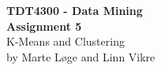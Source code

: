 
\begin{titlepage}
	\begin{center}

	
		{\Huge \bf TDT4300 - Data Mining} \\[2.0cm]
		{\Huge \bf Assignment 5} \\[6.0cm]


		{\Huge K-Means and Clustering} \\[8.0cm]


		{\Large by Marte Løge and Linn Vikre} \\[1.0cm]


	\end{center}
\end{titlepage}
